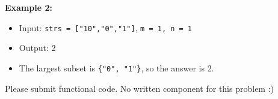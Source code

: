 \documentclass{hw}
\begin{document}
\begin{challenge}
\textbf{Example 2:}
\begin{itemize}
    \item Input: \texttt{strs = ["10","0","1"]}, \texttt{m = 1, n = 1}
    \item Output: 2
    \item The largest subset is \texttt{\{"0", "1"\}}, so the answer is 2.
\end{itemize}


\end{challenge}


\begin{solution}
    Please submit functional code. No written component for this problem :)
\end{solution}
\end{document}
